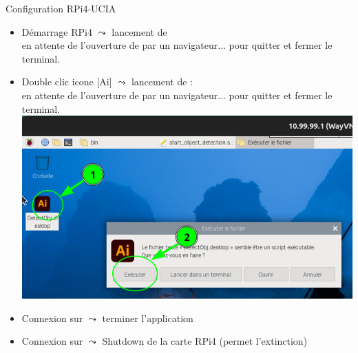 \documentclass[11pt,serif,mathserif,compress,hyperref={colorlinks}]{beamer}
\begin{document}
\begin{frame}{Configuration RPi4-UCIA}
  
  \begin{tcolorbox}[title=Exploitation des réseaux YOLO : Bureau à distance (VNC), add to width=.7cm, height=68mm]
    {\small
      \begin{itemize}
      \item<1-> Démarrage RPi4 $\leadsto$ lancement de \\
        en attente de l'ouverture de  par un navigateur... 
         pour quitter et fermer le terminal.
      \item<2-> Double clic icone [Ai] $\leadsto$ lancement de  : \\
        en attente de l'ouverture de  par un navigateur... 
         pour quitter et fermer le terminal.\\
          {\vspace*{-2.5cm}\includegraphics[width=.9\textwidth]{images/Bureau-distance-iconeAI.png}}
      \item<4-> Connexion sur  $\leadsto$ terminer l'application\\
      \item<4-> Connexion sur  $\leadsto$ Shutdown de la carte RPi4 (permet l'extinction)
      \end{itemize}
    }
  \end{tcolorbox}
    
\end{frame}
\end{document}
